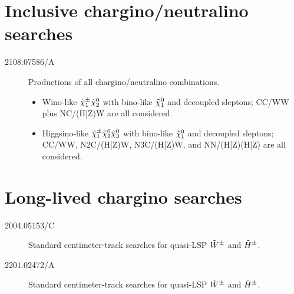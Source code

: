 \section[Inclusive ino searches]{Inclusive chargino/neutralino searches}
\begin{description}
\item[2108.07586/A] Productions of all chargino/neutralino combinations.
\begin{itemize}
 \item Wino-like $\charPM[1]\neut[2]$ with bino-like $\neut[1]$ and decoupled sleptons; CC/WW plus NC/(H|Z)W are all considered.
 \item Higgsino-like $\charPM[1]\neut[2]\neut[3]$ with bino-like $\neut[1]$ and decoupled sleptons; CC/WW, N2C/(H|Z)W, N3C/(H|Z)W, and NN/(H|Z)(H|Z) are all considered.
\end{itemize}
\end{description}


\section[Long-lived chargino searches]{Long-lived chargino searches}
\begin{description}
\item[2004.05153/C] Standard centimeter-track searches for quasi-LSP $\winoPM$ and $\hinoPM$.
\item[2201.02472/A] Standard centimeter-track searches for quasi-LSP $\winoPM$ and $\hinoPM$.
\end{description}








